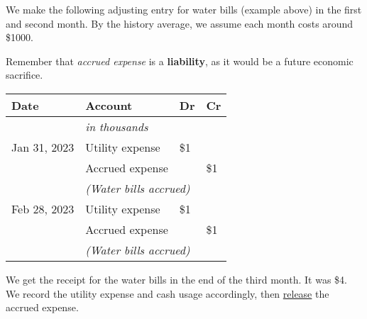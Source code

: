 \begin{tcolorbox}[colframe=black,colback=white,title=Example Adjusting Entry (Accrued Expense)]
    We make the following adjusting entry for water bills (example above) in the first and second month. By the history average, we assume each month costs around \$1000.

    Remember that \textit{accrued expense} is a \textbf{liability}, as it would be a future economic sacrifice.

    \vspace{1em}

    \begin{tabular}{llll}
        \textbf{Date} & \textbf{Account}                                   & \textbf{Dr} & \textbf{Cr} \\
        \hline
                      & \textit{in thousands}                              &             &             \\
        Jan 31, 2023  & Utility expense                                    & \$1         &             \\
                      & \quad Accrued expense                              &             & \$1         \\
                      & \multicolumn{3}{l}{\textit{(Water bills accrued)}}                             \\
        Feb 28, 2023  & Utility expense                                    & \$1         &             \\
                      & \quad Accrued expense                              &             & \$1         \\
                      & \multicolumn{3}{l}{\textit{(Water bills accrued)}}                             \\
    \end{tabular}
    \vspace{1em}

    We get the receipt for the water bills in the end of the third month. It was \$4. We record the utility expense and cash usage accordingly, then \hyperref[thm:release]{release} the accrued expense.


\end{tcolorbox}
